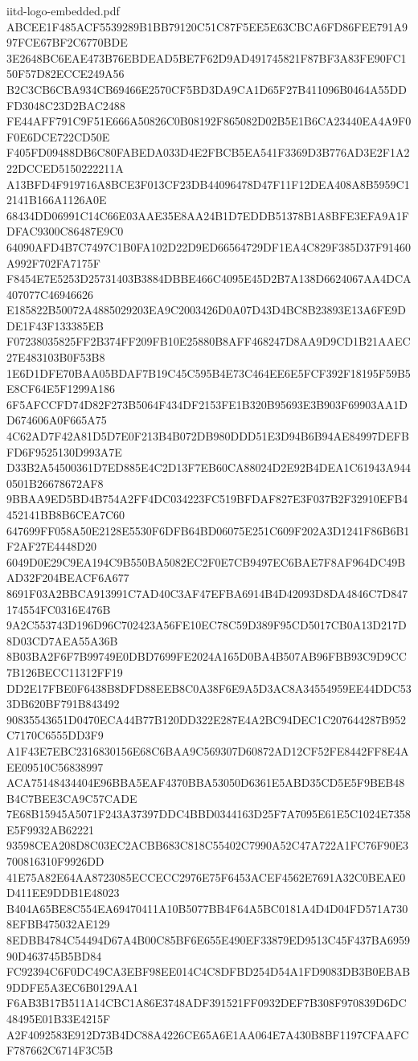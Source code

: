\begin{filecontents*}[overwrite]{iitd-logo-embedded.pdf}
ABCEE1F485ACF5539289B1BB79120C51C87F5EE5E63CBCA6FD86FEE791A997FCE67BF2C6770BDE
3E2648BC6EAE473B76EBDEAD5BE7F62D9AD491745821F87BF3A83FE90FC150F57D82ECCE249A56
B2C3CB6CBA934CB69466E2570CF5BD3DA9CA1D65F27B411096B0464A55DDFD3048C23D2BAC2488
FE44AFF791C9F51E666A50826C0B08192F865082D02B5E1B6CA23440EA4A9F0F0E6DCE722CD50E
F405FD09488DB6C80FABEDA033D4E2FBCB5EA541F3369D3B776AD3E2F1A222DCCED5150222211A
A13BFD4F919716A8BCE3F013CF23DB44096478D47F11F12DEA408A8B5959C12141B166A1126A0E
68434DD06991C14C66E03AAE35E8AA24B1D7EDDB51378B1A8BFE3EFA9A1FDFAC9300C86487E9C0
64090AFD4B7C7497C1B0FA102D22D9ED66564729DF1EA4C829F385D37F91460A992F702FA7175F
F8454E7E5253D25731403B3884DBBE466C4095E45D2B7A138D6624067AA4DCA407077C46946626
E185822B50072A4885029203EA9C2003426D0A07D43D4BC8B23893E13A6FE9DDE1F43F133385EB
F07238035825FF2B374FF209FB10E25880B8AFF468247D8AA9D9CD1B21AAEC27E483103B0F53B8
1E6D1DFE70BAA05BDAF7B19C45C595B4E73C464EE6E5FCF392F18195F59B5E8CF64E5F1299A186
6F5AFCCFD74D82F273B5064F434DF2153FE1B320B95693E3B903F69903AA1DD674606A0F665A75
4C62AD7F42A81D5D7E0F213B4B072DB980DDD51E3D94B6B94AE84997DEFBFD6F9525130D993A7E
D33B2A54500361D7ED885E4C2D13F7EB60CA88024D2E92B4DEA1C61943A9440501B26678672AF8
9BBAA9ED5BD4B754A2FF4DC034223FC519BFDAF827E3F037B2F32910EFB4452141BB8B6CEA7C60
647699FF058A50E2128E5530F6DFB64BD06075E251C609F202A3D1241F86B6B1F2AF27E4448D20
6049D0E29C9EA194C9B550BA5082EC2F0E7CB9497EC6BAE7F8AF964DC49BAD32F204BEACF6A677
8691F03A2BBCA913991C7AD40C3AF47EFBA6914B4D42093D8DA4846C7D847174554FC0316E476B
9A2C553743D196D96C702423A56FE10EC78C59D389F95CD5017CB0A13D217D8D03CD7AEA55A36B
8B03BA2F6F7B99749E0DBD7699FE2024A165D0BA4B507AB96FBB93C9D9CC7B126BECC11312FF19
DD2E17FBE0F6438B8DFD88EEB8C0A38F6E9A5D3AC8A34554959EE44DDC533DB620BF791B843492
90835543651D0470ECA44B77B120DD322E287E4A2BC94DEC1C207644287B952C7170C6555DD3F9
A1F43E7EBC2316830156E68C6BAA9C569307D60872AD12CF52FE8442FF8E4AEE09510C56838997
ACA75148434404E96BBA5EAF4370BBA53050D6361E5ABD35CD5E5F9BEB48B4C7BEE3CA9C57CADE
7E68B15945A5071F243A37397DDC4BBD0344163D25F7A7095E61E5C1024E7358E5F9932AB62221
93598CEA208D8C03EC2ACBB683C818C55402C7990A52C47A722A1FC76F90E3700816310F9926DD
41E75A82E64AA8723085ECCECC2976E75F6453ACEF4562E7691A32C0BEAE0D411EE9DDB1E48023
B404A65BE8C554EA69470411A10B5077BB4F64A5BC0181A4D4D04FD571A7308EFBB475032AE129
8EDBB4784C54494D67A4B00C85BF6E655E490EF33879ED9513C45F437BA695990D463745B5BD84
FC92394C6F0DC49CA3EBF98EE014C4C8DFBD254D54A1FD9083DB3B0EBAB9DDFE5A3EC6B0129AA1
F6AB3B17B511A14CBC1A86E3748ADF391521FF0932DEF7B308F970839D6DC48495E01B33E4215F
A2F4092583E912D73B4DC88A4226CE65A6E1AA064E7A430B8BF1197CFAAFCF787662C6714F3C5B

\end{filecontents*}
